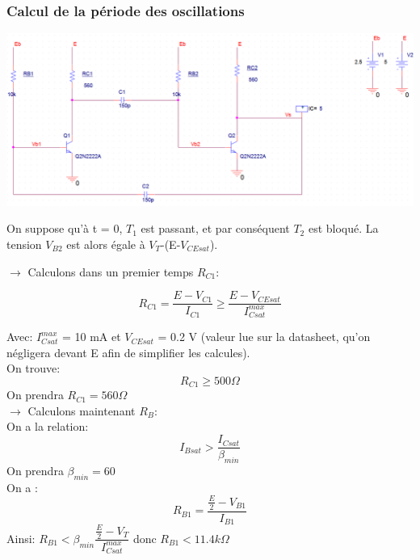 \documentclass[a4paper]{report}
\begin{document}
\subsubsection{Calcul de la période des oscillations}
\begin{center}
\includegraphics[width=1\textwidth]{multivib.PNG}
\end{center}


On suppose qu'à t = 0, $T_1$ est passant, et par conséquent $T_2$ est bloqué. La tension $V_{B2}$ est alors égale à $V_T$-(E-$V_{CEsat}$). \\
\vspace{0.4cm}

$\rightarrow$ Calculons dans un premier temps $R_{C1}$:

$$R_{C1} = \dfrac{E-V_{C1}}{I_{C1}} \geq \dfrac{E-V_{CEsat}}{I_{Csat}^{max}}$$

Avec: $I_{Csat}^{max}$ = 10 mA et $V_{CEsat}$ = 0.2 V (valeur lue sur la datasheet, qu'on négligera devant E afin de simplifier les calcules).\\
On trouve:
$$R_{C1} \geq 500 \Omega$$
On prendra \hspace{5.3cm} $R_{C1} = 560 \Omega$ \\

\vspace{0.5cm}
$\rightarrow$ Calculons maintenant $R_B$:\\

On a la relation:
$$I_{Bsat} > \dfrac{I_{Csat}}{\beta _{min}}$$
On prendra $\beta _{min} =60$\\

On a :
$$R_{B1}=\dfrac{\frac{E}{2}-V_{B1}}{I_{B1}}$$
Ainsi: \hspace{2.5cm} $R_{B1} < \beta _{min} \dfrac{\frac{E}{2}-V_{T}}{I_{Csat}^{max}}$ \hspace{0.6cm} donc \hspace{0.6cm} $R_{B1}<11.4k \Omega$\\
\end{document}
